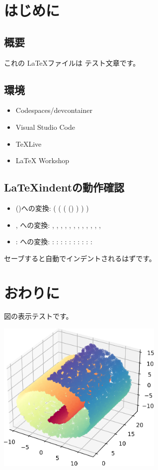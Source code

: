 \documentclass[12pt]{jreport}
\begin{document}
\chapter{はじめに}
\section{概要}
これの \LaTeX ファイルは テスト文章です。
\section{環境}
\begin{itemize}
	\item Codespaces/devcontainer
	\item Visual Studio Code
	\item TeXLive
	\item LaTeX Workshop
\end{itemize}
\section{\LaTeX indentの動作確認}
\begin{itemize}
	\item ()への変換:  ( ( ( () ) ) )
	\item , への変換: , , , , , , , , , , , ,
	\item : への変換: : : : : : : : : : :
\end{itemize}
セーブすると自動でインデントされるはずです。
\chapter{おわりに}
図の表示テストです。

\bigskip

\includegraphics*[width=8cm]{./images/swissroll.eps}
\end{document}
